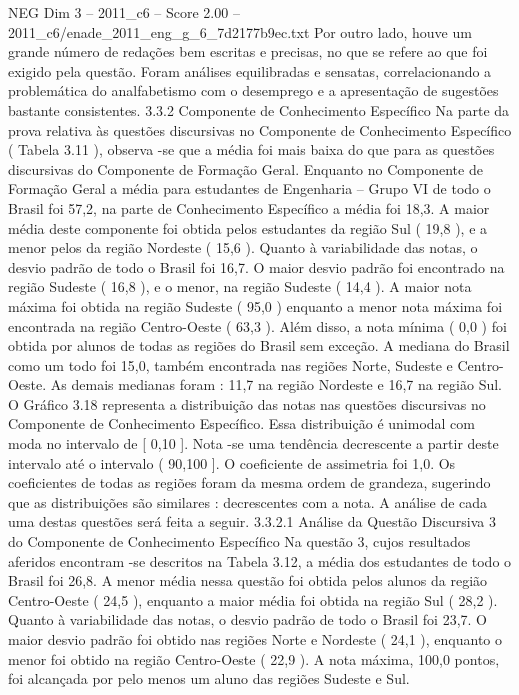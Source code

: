 \begin{textsample}{NEG Dim 3 – 2011\_c6 – Score 2.00 – 2011\_c6/enade\_2011\_eng\_g\_6\_7d2177b9ec.txt}
Por outro lado, houve um grande número de redações bem escritas e precisas, no que se refere ao que foi exigido pela questão.
Foram análises equilibradas e sensatas, correlacionando a problemática do analfabetismo com o desemprego e a apresentação de sugestões bastante consistentes. 3.3.2 Componente de Conhecimento Específico Na parte da prova relativa às questões discursivas no Componente de Conhecimento Específico ( Tabela 3.11 ), observa -se que a média foi mais baixa do que para as questões discursivas do Componente de Formação Geral.
Enquanto no Componente de Formação Geral a média para estudantes de Engenharia – Grupo VI de todo o Brasil foi 57,2, na parte de Conhecimento Específico a média foi 18,3.
A maior média deste componente foi obtida pelos estudantes da região Sul ( 19,8 ), e a menor pelos da região Nordeste ( 15,6 ).
Quanto à variabilidade das notas, o desvio padrão de todo o Brasil foi 16,7.
O maior desvio padrão foi encontrado na região Sudeste ( 16,8 ), e o menor, na região Sudeste ( 14,4 ).
A maior nota máxima foi obtida na região Sudeste ( 95,0 ) enquanto a menor nota máxima foi encontrada na região Centro-Oeste ( 63,3 ).
Além disso, a nota mínima ( 0,0 ) foi obtida por alunos de todas as regiões do Brasil sem exceção.
A mediana do Brasil como um todo foi 15,0, também encontrada nas regiões Norte, Sudeste e Centro-Oeste.
As demais medianas foram : 11,7 na região Nordeste e 16,7 na região Sul.
O Gráfico 3.18 representa a distribuição das notas nas questões discursivas no Componente de Conhecimento Específico.
Essa distribuição é unimodal com moda no intervalo de [ 0,10 ].
Nota -se uma tendência decrescente a partir deste intervalo até o intervalo ( 90,100 ].
O coeficiente de assimetria foi 1,0.
Os coeficientes de todas as regiões foram da mesma ordem de grandeza, sugerindo que as distribuições são similares : decrescentes com a nota.
A análise de cada uma destas questões será feita a seguir. 3.3.2.1 Análise da Questão Discursiva 3 do Componente de Conhecimento Específico Na questão 3, cujos resultados aferidos encontram -se descritos na Tabela 3.12, a média dos estudantes de todo o Brasil foi 26,8.
A menor média nessa questão foi obtida pelos alunos da região Centro-Oeste ( 24,5 ), enquanto a maior média foi obtida na região Sul ( 28,2 ).
Quanto à variabilidade das notas, o desvio padrão de todo o Brasil foi 23,7.
O maior desvio padrão foi obtido nas regiões Norte e Nordeste ( 24,1 ), enquanto o menor foi obtido na região Centro-Oeste ( 22,9 ).
A nota máxima, 100,0 pontos, foi alcançada por pelo menos um aluno das regiões Sudeste e Sul.

\end{textsample}
